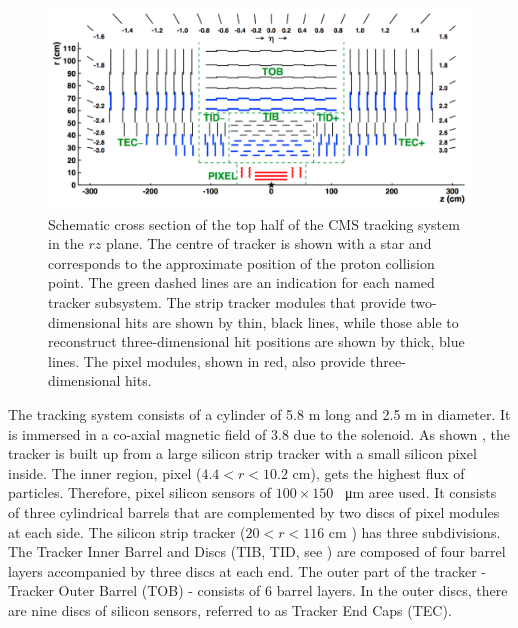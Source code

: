 \begin{figure}[htbp]
	\centering
	\includegraphics[width=1.\textwidth]{2_ExperimentalSetup/Figures/imageedit_11_9317262269}
  \caption{Schematic cross section of the top half of the CMS tracking system in the $rz$ plane. The centre of tracker is shown with a star and corresponds to the approximate position of the proton collision point. The green dashed lines are an indication for each named tracker subsystem. The strip tracker modules that provide two-dimensional hits are shown by thin, black lines, while those able to reconstruct three-dimensional hit positions are shown by thick, blue lines. The pixel modules, shown in red, also provide three-dimensional hits. \cite{Bayatian:2006zz} }
	\label{fig:Tracker}
\end{figure}

 The tracking system consists of a cylinder of 5.8 \si{ \meter} long and 2.5 \si{ \meter} in diameter. It is immersed in a co-axial magnetic field of 3.8 \si{ \Tesla} due to the solenoid.
 As shown , the tracker is built up from a large silicon strip tracker with a small silicon pixel inside. 
 The inner region, pixel ($4.4<r<10.2$ \si{ \cm}), gets the highest flux of particles. Therefore, pixel silicon sensors of $100 \times 150$ \si{ \squared \micro \meter} aree used. It consists of three cylindrical barrels that are complemented by two discs of pixel modules at each side.
 The silicon strip tracker ($20<r<116$ \si{ \cm} ) has three subdivisions. The Tracker Inner Barrel  and Discs (TIB, TID, see ) are composed of four barrel layers accompanied by three discs at each end. The outer part of the tracker - Tracker Outer Barrel (TOB) -  consists  of 6 barrel layers. In the outer discs, there are nine discs of silicon sensors, referred to as Tracker End Caps (TEC). 
  
